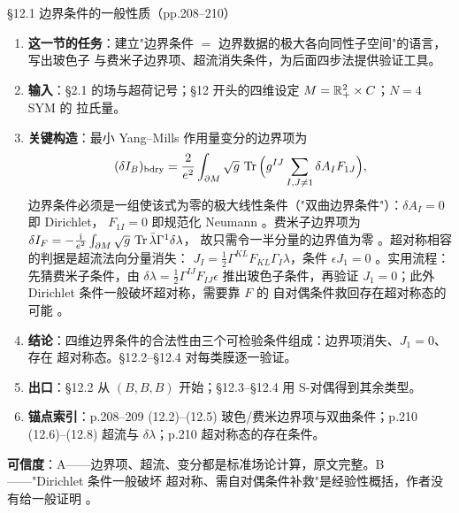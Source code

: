 \begin{kcard}{\S12.1 边界条件的一般性质（pp.208--210）}
\begin{enumerate}[label=\textbf{\arabic*}]
\item \textbf{这一节的任务}：建立"边界条件 $=$ 边界数据的极大各向同性子空间"的语言，写出玻色子
  与费米子边界项、超流消失条件，为后面四步法提供验证工具。
\item \textbf{输入}：\S2.1 的场与超荷记号；\S12 开头的四维设定 $M=\mathbb{R}^2_+\times C$；$N=4$ SYM 的
  拉氏量。
\item \textbf{关键构造}：最小 Yang--Mills 作用量变分的边界项为
\begin{equation}
(\delta I_B)_{\text{bdry}}=\frac{2}{e^2}\int_{\partial M}\sqrt g\,\operatorname{Tr}\Big(g^{IJ}\sum_{I,J\neq1}
\delta A_I F_{1J}\Big),
\label{eq:geom-bdry-term}
\end{equation}
  边界条件必须是一组使该式为零的极大线性条件（"双曲边界条件"）：$\delta A_I=0$ 即 Dirichlet，
  $F_{1I}=0$ 即规范化 Neumann \pA{}。费米子边界项为
  $\delta I_F=-\frac{\mathrm{i}}{e^2}\int_{\partial M}\sqrt g\,\operatorname{Tr}\bar\lambda\Gamma^1\delta\lambda$，
  故只需令一半分量的边界值为零 \pA{}。超对称相容的判据是超流法向分量消失：
  $J_I=\frac12\Gamma^{KL}F_{KL}\Gamma_I\lambda$，条件 $\epsilon J_1=0$
  \pA{}。实用流程：先猜费米子条件，由 $\delta\lambda=\frac12\Gamma^{IJ}F_{IJ}
  \epsilon$ 推出玻色子条件，再验证 $J_1=0$；此外 Dirichlet 条件一般破坏超对称，需要靠 $F$ 的
  自对偶条件救回存在超对称态的可能 \pA{}。
\item \textbf{结论}：四维边界条件的合法性由三个可检验条件组成：边界项消失、$J_1=0$、存在
  超对称态。\S12.2--\S12.4 对每类膜逐一验证。
\item \textbf{出口}：\S12.2 从 $(B,B,B)$ 开始；\S12.3--\S12.4 用 S-对偶得到其余类型。
\item \textbf{锚点索引}：p.208--209 (12.2)--(12.5) 玻色/费米边界项与双曲条件；p.210
  (12.6)--(12.8) 超流与 $\delta\lambda$；p.210 超对称态的存在条件。
\end{enumerate}
\textbf{可信度}：A——边界项、超流、变分都是标准场论计算，原文完整。B——"Dirichlet 条件一般破坏
超对称、需自对偶条件补救"是经验性概括，作者没有给一般证明 \pB{}。
\end{kcard}

